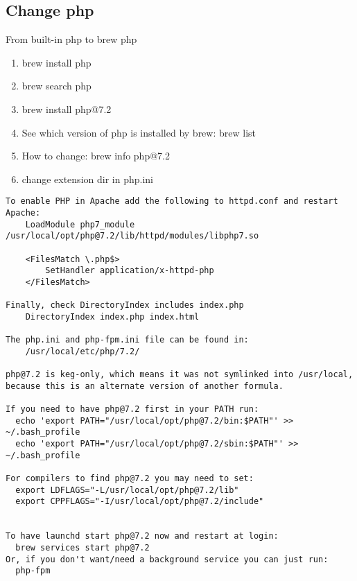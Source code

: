     \subsection{Change php}
    From built-in php to brew php
    \begin{enumerate}
        \item \colorbox{gray!30}{brew install php}
        \item \colorbox{gray!30}{brew search php}
        \item \colorbox{gray!30}{brew install php@7.2}
        \item See which version of php is installed by brew: \colorbox{gray!30}{brew list}
        \item How to change: \colorbox{gray!30}{brew info php@7.2}
        \item change extension dir in php.ini
    \end{enumerate}
\begin{lstlisting}
To enable PHP in Apache add the following to httpd.conf and restart Apache:
    LoadModule php7_module /usr/local/opt/php@7.2/lib/httpd/modules/libphp7.so

    <FilesMatch \.php$>
        SetHandler application/x-httpd-php
    </FilesMatch>

Finally, check DirectoryIndex includes index.php
    DirectoryIndex index.php index.html

The php.ini and php-fpm.ini file can be found in:
    /usr/local/etc/php/7.2/

php@7.2 is keg-only, which means it was not symlinked into /usr/local,
because this is an alternate version of another formula.

If you need to have php@7.2 first in your PATH run:
  echo 'export PATH="/usr/local/opt/php@7.2/bin:$PATH"' >> ~/.bash_profile
  echo 'export PATH="/usr/local/opt/php@7.2/sbin:$PATH"' >> ~/.bash_profile

For compilers to find php@7.2 you may need to set:
  export LDFLAGS="-L/usr/local/opt/php@7.2/lib"
  export CPPFLAGS="-I/usr/local/opt/php@7.2/include"


To have launchd start php@7.2 now and restart at login:
  brew services start php@7.2
Or, if you don't want/need a background service you can just run:
  php-fpm
\end{lstlisting}
    
    
    
